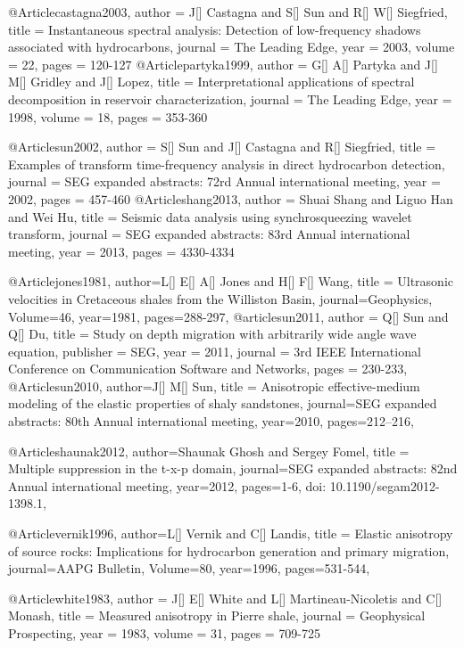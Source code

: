 @Article{castagna2003,
  author = 	 {J[] Castagna and S[] Sun and R[] W[] Siegfried},
  title = 	 {Instantaneous spectral analysis: Detection of low-frequency shadows associated with hydrocarbons},
  journal = 	 {The Leading Edge},
  year = 	 2003,
  volume = 	 22,
  pages = 	 {120-127}
}
@Article{partyka1999,
  author = 	 {G[] A[] Partyka and J[] M[] Gridley and J[] Lopez},
  title = 	 {Interpretational applications of spectral decomposition in reservoir characterization},
  journal = 	 {The Leading Edge},
  year = 	 1998,
  volume = 	 18,
  pages = 	 {353-360}
}


@Article{sun2002,
  author = 	 {S[] Sun and J[] Castagna and R[] Siegfried},
  title = 	 {Examples of 
   transform time-frequency analysis in direct hydrocarbon detection},
  journal = 	 {SEG expanded abstracts: 72rd Annual international meeting},
  year = 	 2002,
  pages = 	 {457-460}
}
@Article{shang2013,
  author = 	 {Shuai Shang and Liguo Han and Wei Hu},
  title = 	 {Seismic data analysis using synchrosqueezing wavelet transform},
  journal = 	 {SEG expanded abstracts: 83rd Annual international meeting},
  year = 	 2013,
  pages = 	 {4330-4334}
}

@Article{jones1981,
  author={L[] E[] A[] Jones and H[] F[] Wang},
  title = {Ultrasonic velocities in Cretaceous shales from the Williston Basin},
  journal={Geophysics},
  Volume=46,
  year=1981,
  pages={288-297},
}
@article{sun2011,
  author =	 {Q[] Sun and Q[] Du},
  title =	 {Study on depth migration with arbitrarily wide angle wave equation},
  publisher =	 {SEG},
  year =	 2011,
  journal =	 {3rd IEEE International Conference on Communication Software and Networks},
  pages =	 {230-233},
}
@Article{sun2010,
  author={J[] M[] Sun},
  title = {Anisotropic effective-medium modeling of the elastic properties of shaly sandstones},
  journal={SEG expanded abstracts: 80th Annual international meeting},
  year=2010,
  pages={212–216},
}


@Article{shaunak2012,
  author={Shaunak Ghosh and Sergey Fomel},
  title = {Multiple suppression in the t-x-p domain},
  journal={SEG expanded abstracts: 82nd Annual international meeting},
  year=2012,
  pages={1-6, doi: 10.1190/segam2012-1398.1},
}

@Article{vernik1996,
  author={L[] Vernik and C[] Landis},
  title = {Elastic anisotropy of source rocks: Implications for hydrocarbon
generation and primary migration},
  journal={AAPG Bulletin},
  Volume=80,
  year=1996,
  pages={531-544},
}

@Article{white1983,
  author = 	 {J[] E[] White and L[] Martineau-Nicoletis and C[] Monash},
  title = 	 {Measured anisotropy in Pierre shale},
  journal = 	 {Geophysical Prospecting},
  year = 	 1983,
  volume =	 31,
  pages =	 {709-725}
}

